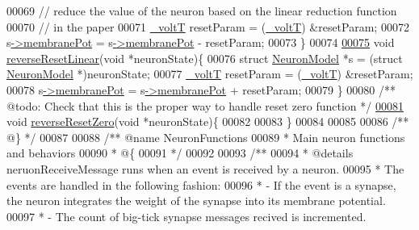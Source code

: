 \begin{DoxyCode}
00069   \textcolor{comment}{// reduce the value of the neuron based on the linear reduction function}
00070   \textcolor{comment}{// in the paper}
00071     \hyperlink{assist_8h_abe1fc1b8f9efd1187e564bcb8de7f815}{\_voltT} resetParam = (\hyperlink{assist_8h_abe1fc1b8f9efd1187e564bcb8de7f815}{\_voltT}) &resetParam;
00072   s\hyperlink{structneuron_state_a0fdd8f44c4105a94e17c4c58a51db486}{->}\hyperlink{structneuron_state_a0fdd8f44c4105a94e17c4c58a51db486}{membranePot} = s\hyperlink{structneuron_state_a0fdd8f44c4105a94e17c4c58a51db486}{->}\hyperlink{structneuron_state_a0fdd8f44c4105a94e17c4c58a51db486}{membranePot} - resetParam;
00073 \}
00074 
\hypertarget{neuron_8c_source_l00075}{}\hyperlink{neuron_8h_a09e54832158e2f6abe898437979aae00}{00075} \textcolor{keywordtype}{void} \hyperlink{neuron_8h_a09e54832158e2f6abe898437979aae00}{reverseResetLinear}(\textcolor{keywordtype}{void} *neuronState)\{
00076     \textcolor{keyword}{struct} \hyperlink{structneuron_state}{NeuronModel} *s = (\textcolor{keyword}{struct} \hyperlink{structneuron_state}{NeuronModel} *)neuronState;
00077     \hyperlink{assist_8h_abe1fc1b8f9efd1187e564bcb8de7f815}{\_voltT} resetParam = (\hyperlink{assist_8h_abe1fc1b8f9efd1187e564bcb8de7f815}{\_voltT}) &resetParam;
00078     s\hyperlink{structneuron_state_a0fdd8f44c4105a94e17c4c58a51db486}{->}\hyperlink{structneuron_state_a0fdd8f44c4105a94e17c4c58a51db486}{membranePot} = s\hyperlink{structneuron_state_a0fdd8f44c4105a94e17c4c58a51db486}{->}\hyperlink{structneuron_state_a0fdd8f44c4105a94e17c4c58a51db486}{membranePot} + resetParam;
00079 \}
00080 \textcolor{comment}{/** @todo: Check that this is the proper way to handle reset zero function */}
\hypertarget{neuron_8c_source_l00081}{}\hyperlink{neuron_8h_ae53276ccdb759ba1ea09806cbf9fc940}{00081} \textcolor{keywordtype}{void} \hyperlink{neuron_8h_ae53276ccdb759ba1ea09806cbf9fc940}{reverseResetZero}(\textcolor{keywordtype}{void} *neuronState)\{
00082 
00083 \}
00084 
00085 
00086     \textcolor{comment}{/** @\} */}
00087 
00088 \textcolor{comment}{/** @name NeuronFunctions }
00089 \textcolor{comment}{* Main neuron functions and behaviors}
00090 \textcolor{comment}{*  @\{ }
00091 \textcolor{comment}{ */}
00092 
00093 \textcolor{comment}{/**}
00094 \textcolor{comment}{ *  @details  neruonReceiveMessage runs when an event is received by a neuron.}
00095 \textcolor{comment}{ *  The events are handled in the following fashion:}
00096 \textcolor{comment}{ *  - If the event is a synapse, the neuron integrates the weight of the synapse into its membrane
       potential.}
00097 \textcolor{comment}{ *    - The count of big-tick synapse messages recived is incremented.}

\end{DoxyCode}

